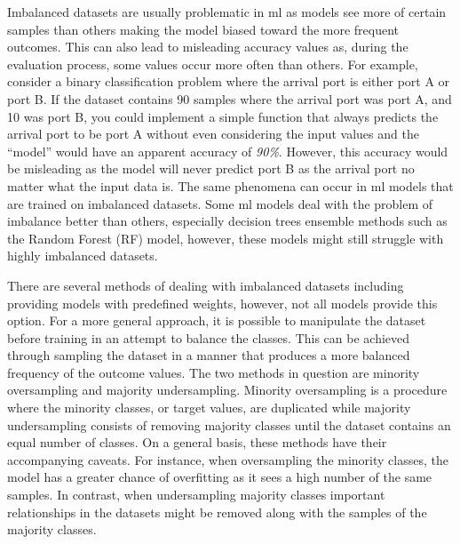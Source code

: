 Imbalanced datasets are usually problematic in \acrshort{ml} as models see more of certain samples than others making the model biased toward the more frequent outcomes. This can also lead to misleading accuracy values as, during the evaluation process, some values occur more often than others. For example, consider a binary classification problem where the arrival port is either port A or port B. If the dataset contains 90 samples where the arrival port was port A, and 10 was port B, you could implement a simple function that always predicts the arrival port to be port A without even considering the input values and the ``model'' would have an apparent accuracy of \textit{90\%}. However, this accuracy would be misleading as the model will never predict port B as the arrival port no matter what the input data is. The same phenomena can occur in \acrshort{ml} models that are trained on imbalanced datasets. Some \acrshort{ml} models deal with the problem of imbalance better than others, especially decision trees ensemble methods such as the Random Forest (RF) model, however, these models might still struggle with highly imbalanced datasets.

There are several methods of dealing with imbalanced datasets including providing models with predefined weights, however, not all models provide this option. For a more general approach, it is possible to manipulate the dataset before training in an attempt to balance the classes. This can be achieved through sampling the dataset in a manner that produces a more balanced frequency of the outcome values. The two methods in question are minority oversampling and majority undersampling. Minority oversampling is a procedure where the minority classes, or target values, are duplicated while majority undersampling consists of removing majority classes until the dataset contains an equal number of classes. On a general basis, these methods have their accompanying caveats. For instance, when oversampling the minority classes, the model has a greater chance of overfitting as it sees a high number of the same samples. In contrast, when undersampling majority classes important relationships in the datasets might be removed along with the samples of the majority classes.

